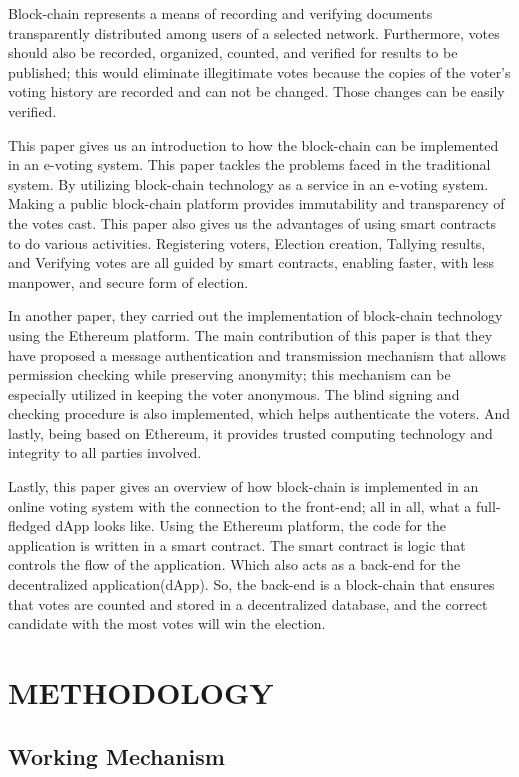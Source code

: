 \documentclass[a4paper,12pt]{report}
\begin{document}
Block-chain represents a means of recording and verifying documents transparently distributed among users of a selected network. Furthermore, votes should also be recorded, organized, counted, and verified for results to be published; this would eliminate illegitimate votes because the copies of the voter's voting history are recorded and can not be changed. Those changes can be easily verified.

This paper gives us an introduction to how the block-chain can be implemented in an e-voting system. This paper tackles the problems faced in the traditional system. By utilizing block-chain technology as a service in an e-voting system. Making a public block-chain platform provides immutability and transparency of the votes cast. This paper also gives us the advantages of using smart contracts to do various activities. Registering voters, Election creation, Tallying results, and Verifying votes are all guided by smart contracts, enabling faster, with less manpower, and secure form of election.

In another paper, they carried out the implementation of block-chain technology using the Ethereum platform. The main contribution of this paper is that they have proposed a message authentication and transmission mechanism that allows permission checking while preserving anonymity; this mechanism can be especially utilized in keeping the voter anonymous. The blind signing and checking procedure is also implemented, which helps authenticate the voters. And lastly, being based on Ethereum, it provides trusted computing technology and integrity to all parties involved.

Lastly, this paper gives an overview of how block-chain is implemented in an online voting system with the connection to the front-end; all in all, what a full-fledged dApp looks like. Using the Ethereum platform, the code for the application is written in a smart contract. The smart contract is logic that controls the flow of the application. Which also acts as a back-end for the decentralized application(dApp). So, the back-end is a block-chain that ensures that votes are counted and stored in a decentralized database, and the correct candidate with the most votes will win the election.

\chapter{METHODOLOGY}
\section{Working Mechanism}
\end{document}
